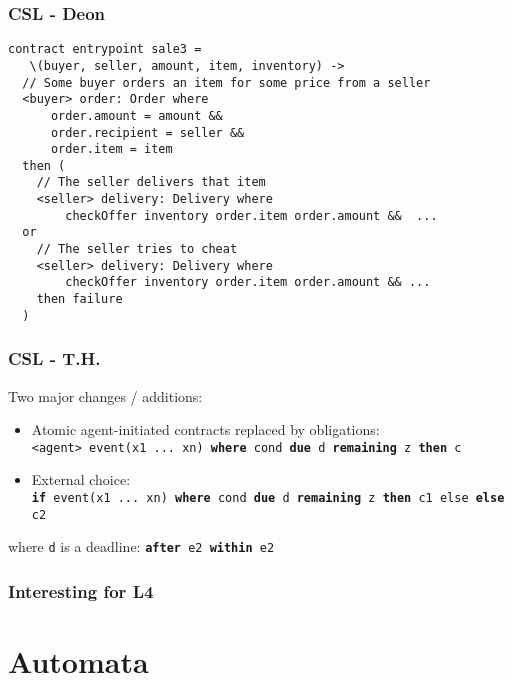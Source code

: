 \documentclass{beamer}
\begin{document}
\begin{frame}[fragile]\frametitle{CSL - Deon}

\small
\begin{verbatim}
contract entrypoint sale3 = 
   \(buyer, seller, amount, item, inventory) ->
  // Some buyer orders an item for some price from a seller
  <buyer> order: Order where
      order.amount = amount &&
      order.recipient = seller &&
      order.item = item
  then (
    // The seller delivers that item
    <seller> delivery: Delivery where
        checkOffer inventory order.item order.amount &&  ...
  or
    // The seller tries to cheat
    <seller> delivery: Delivery where
        checkOffer inventory order.item order.amount && ...
    then failure
  )
\end{verbatim}
\normalsize


\end{frame}


\begin{frame}[fragile]\frametitle{CSL - T.H.}

  Two major changes / additions:
  \begin{itemize}
  \item Atomic agent-initiated contracts replaced by obligations:\\
    \texttt{<agent> event(x1 ... xn) \textbf{where} cond \textbf{due} d \textbf{remaining} z \textbf{then} c}
  \item External choice:\\
    \texttt{\textbf{if} event(x1 ... xn)  \textbf{where} cond \textbf{due} d
      \textbf{remaining} z \textbf{then} c1 else \textbf{else} c2}
  \end{itemize}
  where \texttt{d} is a deadline: \texttt{\textbf{after} e2 \textbf{within} e2}


\end{frame}



\begin{frame}[fragile]\frametitle{Interesting for L4}


\end{frame}



\section{Automata}
\end{document}
